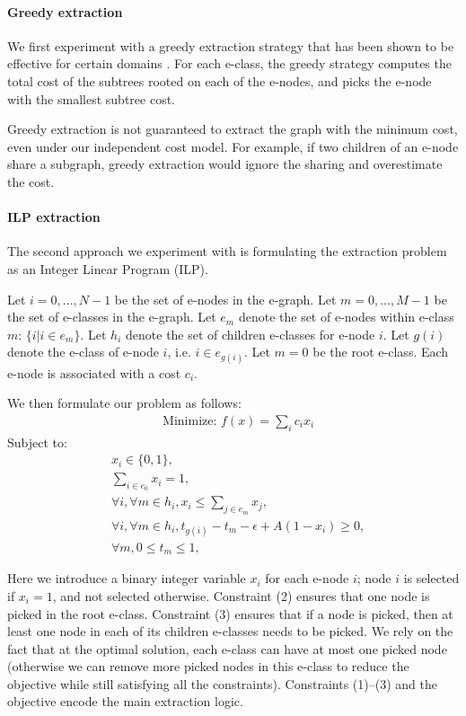 \paragraph{Greedy extraction}

We first experiment with a greedy extraction strategy that has been shown to be effective for certain domains \cite{herbie, spores, egg}.
For each e-class, the greedy strategy computes the total cost of the subtrees rooted on each of the e-nodes, and picks the e-node with the smallest subtree cost.

Greedy extraction is not guaranteed to extract the graph with the minimum cost, even under our independent cost model.
For example, if two children of an e-node share a subgraph, greedy extraction would ignore the sharing and overestimate the cost.

\paragraph{ILP extraction}
The second approach we experiment with is formulating the extraction problem as an Integer Linear Program (ILP).

Let $i = 0, ..., N-1$ be the set of e-nodes in the e-graph.
Let $m = 0, ..., M-1$ be the set of e-classes in the e-graph.
Let $e_m$ denote the set of e-nodes within e-class $m$: $\{i | i\in e_m \}$.
Let $h_i$ denote the set of children e-classes for e-node $i$.
Let $g(i)$ denote the e-class of e-node $i$, i.e. $i\in e_{g(i)}$.
Let $m=0$ be the root e-class.
Each e-node is associated with a cost $c_i$.

We then formulate our problem as follows:
\begin{align*}
    &\textrm{Minimize: } f(x) = \sum_{i} c_i x_i
\end{align*}
Subject to:
\begin{align}
    &x_i \in \{0, 1\}, \\
    &\sum_{i\in e_0} x_i = 1, \\
    &\forall i, \forall m \in h_i, x_i \leq \sum_{j\in e_m} x_j , \\
    & \forall i, \forall m \in h_i, t_{g(i)} - t_m - \epsilon + A (1 - x_i) \geq 0, \\
    &\forall m, 0 \leq t_m \leq 1,
\end{align}

Here we introduce a binary integer variable $x_i$ for each e-node $i$; node $i$ is selected if $x_i=1$, and not selected otherwise.
Constraint (2) ensures that one node is picked in the root e-class.
Constraint (3) ensures that if a node is picked, then at least one node in each of its children e-classes needs to be picked.
We rely on the fact that at the optimal solution, each e-class can have at most one picked node (otherwise we can remove more picked nodes in this e-class to reduce the objective while still satisfying all the constraints).
Constraints (1)--(3) and the objective encode the main extraction logic.

